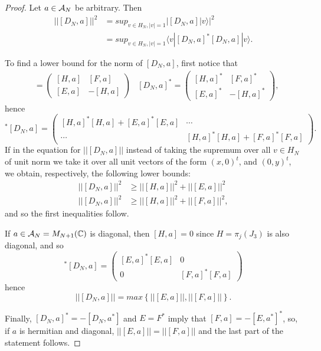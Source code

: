 \begin{proof}
Let $a \in \mathcal A_N$ be arbitrary. Then
\begin{align*}
    ||[D_N, a]||^2 
        &= sup_{v \in H_N, |v| = 1} |[D_N, a] | v \rangle|^2 \\
        &= sup_{v \in H_N, |v| = 1} \langle v | [D_N, a]^* [D_N, a] | v \rangle.
\end{align*}

To find a lower bound for the norm of $[D_N, a]$, first notice that 
\begin{align*}
    [D_N, a] &= \begin{pmatrix} [H, a] & [F, a] \\ [E, a] & -[H, a] \end{pmatrix}&
    [D_N, a]^* = \begin{pmatrix} [H, a]^* & [F, a]^* \\ [E, a]^* & -[H, a]^* \end{pmatrix},
\end{align*} hence
\begin{equation*}
    [D_N, a]^* [D_N, a] 
    = \begin{pmatrix}
    [H, a]^*[H, a] + [E, a]^*[E, a] & \cdots \\
    \cdots & [H, a]^*[H, a] + [F, a]^*[F, a]
    \end{pmatrix}.
\end{equation*}
If in the equation for $||[D_N, a]||$ instead of taking the supremum over all $v \in H_N$ of unit norm we take it over all unit vectors of the form $(x, 0)^t$, and $(0, y)^t$, we obtain, respectively, the following lower bounds:
\begin{align}
    ||[D_N, a]||^2 &\geq ||[H, a]||^2 + ||[E, a]||^2 \\
    ||[D_N, a]||^2 &\geq ||[H, a]||^2 + ||[F, a]||^2,
\end{align}
and so the first inequalities follow.

If $a \in \mathcal A_N = M_{N+1}(\mathbb{C})$ is diagonal, then $[H, a] = 0$ since $H = \pi_j(J_3)$ is also diagonal, and so
\begin{equation*}
    [D_N, a]^* [D_N, a] 
    = \begin{pmatrix}
    [E, a]^*[E, a] & 0 \\
    0 & [F, a]^*[F, a]
    \end{pmatrix}
\end{equation*}
hence
\begin{equation}
    ||[D_N, a]|| = max\left\{ ||[E, a]||, ||[F, a]|| \right\}.
\end{equation}

Finally, $[D_N, a]^* = -[D_N, a^*]$ and $E = F^*$ imply that $[F, a] = - [E, a^*]^*$, so, if $a$ is hermitian and diagonal, $||[E, a]|| = ||[F, a]||$ and the last part of the statement follows.
\end{proof}


